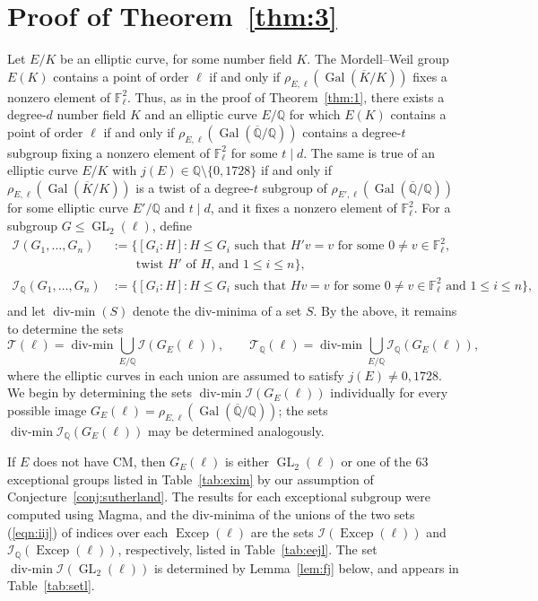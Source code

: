 \documentclass[table,dvipsnames]{amsart}
\newcommand{\F}{\mathbb{F}}
\newcommand{\Q}{\mathbb{Q}}
\newcommand{\Qbar}{\overline{\Q}}
\newcommand{\Gal}{\operatorname{Gal}}
\newcommand{\GL}{\operatorname{GL}}
\newcommand{\Kbar}{\overline K}
\newcommand{\I}{\mathcal{I}}
\newcommand{\divmin}{\operatorname{div-min}}
\numberwithin{equation}{section}
\newcommand{\Excep}{\operatorname{Excep}}
\begin{document}
\section{Proof of Theorem~\ref{thm:3}}

Let $E/K$ be an elliptic curve, for some number field $K$. The Mordell--Weil group $E(K)$ contains a point of order $\ell$ if and only if $\rho_{E,\ell}(\Gal(\Kbar/K))$ fixes a nonzero element of $\F_\ell^2$. Thus, as in the proof of Theorem~\ref{thm:1}, there exists a degree-$d$ number field $K$ and an elliptic curve $E/\Q$ for which $E(K)$ contains a point of order $\ell$ if and only if $\rho_{E,\ell}(\Gal(\Qbar/\Q))$ contains a degree-$t$ subgroup fixing a nonzero element of $\F_\ell^2$ for some $t\mid d$. The same is true of an elliptic curve $E/K$ with $j(E)\in\Q\setminus\{0,1728\}$ if and only if $\rho_{E,\ell}(\Gal(\Kbar/K))$ is a twist of a degree-$t$ subgroup of $\rho_{E',\ell}(\Gal(\Qbar/\Q))$ for some elliptic curve $E'/\Q$ and $t\mid d$, and it fixes a nonzero element of $\F_\ell^2$. For a subgroup $G\le\GL_2(\ell)$, define
\begin{equation}
\label{eqn:iij}
\begin{split}
\I(G_1,\ldots,G_n)&:=\{[G_i:H]:H\le G_i\text{ such that }H'v=v\text{ for some }0\ne v\in\F_\ell^2,\\
&\qquad\text{twist }H'\text{ of }H\text{, and }1\le i\le n\},\\
\I_\Q(G_1,\ldots,G_n)&:=\{[G_i:H]:H\le G_i\text{ such that }Hv=v\text{ for some }0\ne v\in\F_\ell^2\text{ and }1\le i\le n\},\\
\end{split}
\end{equation}
and let $\divmin(S)$ denote the div-minima of a set $S$. By the above, it remains to determine the sets
\begin{equation*}
\mathcal{T}(\ell)=\divmin\bigcup_{E/\Q}\I(G_E(\ell)),\qquad\mathcal{T}_\Q(\ell)=\divmin\bigcup_{E/\Q}\I_\Q(G_E(\ell)),
\end{equation*}
where the elliptic curves in each union are assumed to satisfy $j(E)\ne 0,1728$. We begin by determining the sets $\divmin\I(G_E(\ell))$ individually for every possible image $G_E(\ell)=\rho_{E,\ell}(\Gal(\Qbar/\Q))$; the sets $\divmin\I_\Q(G_E(\ell))$ may be determined analogously.

If $E$ does not have CM, then $G_E(\ell)$ is either $\GL_2(\ell)$ or one of the $63$ exceptional groups listed in Table~\ref{tab:exim} by our assumption of Conjecture~\ref{conj:sutherland}. The results for each exceptional subgroup were computed \cite{code,sutherland2016} using Magma, and the div-minima of the unions of the two sets (\ref{eqn:iij}) of indices over each \(\Excep(\ell)\) are the sets $\I(\Excep(\ell))$ and $\I_\Q(\Excep(\ell))$, respectively, listed in Table~\ref{tab:eejl}. The set $\divmin\I(\GL_2(\ell))$ is determined by Lemma~\ref{lem:fj} below, and appears in Table~\ref{tab:setl}.
\end{document}
